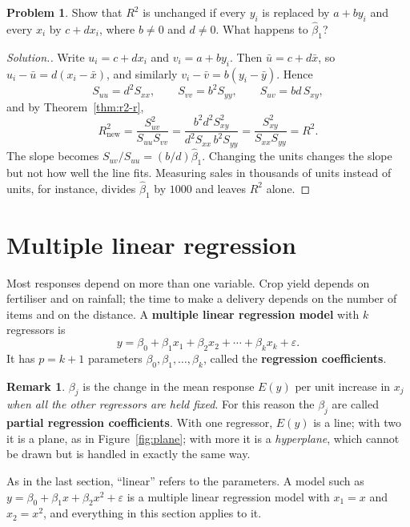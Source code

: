 \documentclass[11pt,a4paper]{article}
\numberwithin{equation}{section}
\theoremstyle{definition}
\newtheorem*{remark}{Remark}
\newtheorem{problemx}{Problem}[subsection]
\newenvironment{problem}{\begin{problemx}}{\end{problemx}}
\newenvironment{solution}
  {\renewcommand{\qedsymbol}{}\begin{proof}[\textit{Solution}.]}
  {\end{proof}}
\begin{document}
\begin{problem}
Show that $R^2$ is unchanged if every $y_i$ is replaced by $a + b y_i$ and every $x_i$ by
$c + d x_i$, where $b \neq 0$ and $d \neq 0$. What happens to $\hat\beta_1$?
\end{problem}

\begin{solution}
Write $u_i = c + d x_i$ and $v_i = a + b y_i$. Then $\bar u = c + d\bar x$, so
$u_i - \bar u = d(x_i - \bar x)$, and similarly $v_i - \bar v = b(y_i - \bar y)$. Hence
\[
S_{uu} = d^2 S_{xx}, \qquad S_{vv} = b^2 S_{yy}, \qquad S_{uv} = bd\, S_{xy},
\]
and by Theorem~\ref{thm:r2-r},
\[
R^2_{\text{new}} = \frac{S_{uv}^2}{S_{uu} S_{vv}} = \frac{b^2 d^2 S_{xy}^2}{d^2 S_{xx}\, b^2 S_{yy}} = \frac{S_{xy}^2}{S_{xx} S_{yy}} = R^2 .
\]
The slope becomes $S_{uv}/S_{uu} = (b/d)\hat\beta_1$. Changing the units changes the slope
but not how well the line fits. Measuring sales in thousands of units instead of units, for
instance, divides $\hat\beta_1$ by $1000$ and leaves $R^2$ alone.
\end{solution}






\section{Multiple linear regression}
Most responses depend on more than one variable. Crop yield depends on fertiliser and on
rainfall; the time to make a delivery depends on the number of items and on the distance.
A \textbf{multiple linear regression model} with $k$ regressors is
\begin{equation}\label{eq:mlr}
y = \beta_0 + \beta_1 x_1 + \beta_2 x_2 + \cdots + \beta_k x_k + \varepsilon .
\end{equation}
It has $p = k + 1$ parameters $\beta_0, \beta_1, \dots, \beta_k$, called the
\textbf{regression coefficients}.

\begin{remark}
$\beta_j$ is the change in the mean response $E(y)$ per unit increase in $x_j$
\emph{when all the other regressors are held fixed}. For this reason the $\beta_j$ are
called \textbf{partial regression coefficients}. With one regressor, $E(y)$ is a line; with
two it is a plane, as in Figure~\ref{fig:plane}; with more it is a \emph{hyperplane}, which
cannot be drawn but is handled in exactly the same way.
\end{remark}

As in the last section, ``linear'' refers to the parameters. A model such as
$y = \beta_0 + \beta_1 x + \beta_2 x^2 + \varepsilon$ is a multiple linear regression model
with $x_1 = x$ and $x_2 = x^2$, and everything in this section applies to it.
\end{document}
